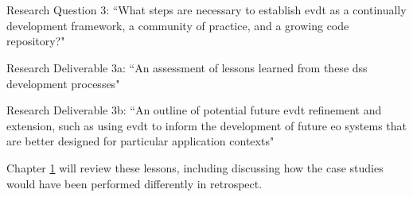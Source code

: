 \chapter{} \label{ch:conclusion}

\section{}

\subsection{}

\subsection{}

\subsection{}

\subsection{}

\section{}

Research Question 3: ``What steps are necessary to establish \ac{evdt} as a continually development framework, a community of practice, and a growing code repository?"

Research Deliverable 3a: ``An assessment of lessons learned from these \ac{dss} development processes"

Research Deliverable 3b: ``An outline of potential future \ac{evdt} refinement and extension, such as using \ac{evdt} to inform the development of future \ac{eo} systems that are better designed for particular application contexts"

Chapter \ref{ch:conclusion} will review these lessons, including discussing how the case studies would have been performed differently in retrospect.

